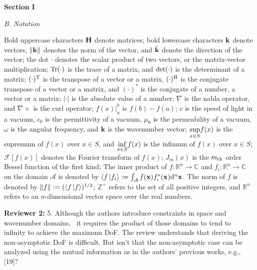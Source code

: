 \documentclass[a4paper,12pt]{article}
\begin{document}
{}
\begin{framed}
    {\bf Section I}

    {\it B. Notation}
    
    \quad Bold uppercase characters {\color{red}${\bf H}$} denote matrices;
    bold lowercase characters {\color{red}${\bf k}$} denote vectors, {\color{red} $\left\| {\bf k} \right\|$ denotes the norm of the vector, and $\hat{\bf k}$ denote the direction of the vector};
    the dot $\cdot$ denotes the scalar product of two vectors, or the matrix-vector multiplication; {\color{red} ${\rm Tr(\cdot)}$ is the trace of a matrix, and ${\rm det}(\cdot)$ is the determinant of a matrix; $(\cdot)^{\rm T}$ is the transpose of a vector or a matrix, $(\cdot)^{\rm H}$ is the conjugate transpose of a vector or a matrix, and $(\cdot)^{*}$ is the conjugate of a number, a vector or a matrix; $|\cdot|$ is the absolute value of a number; $\nabla$ is the nabla operator, and $\nabla \times$ is the curl operator; $f(x)|_a^b$ is $f(b)-f(a)$;}
    $c$ is the speed of light in a vacuum{\color{red}, $\epsilon_0$ is the permittivity of a vacuum, $\mu_0$ is the permeability of a vacuum, $\omega$ is the angular frequency, and ${\bf k}$ is the wavenumber vector; $\underset{x \in S}{\rm sup}f(x)$ is the supremum of $f(x)$ over $x\in S$, and $\underset{x \in S}{\rm inf}f(x)$ is the infimum of $f(x)$ over $x\in S$;} 
    $\mathscr{F}[f(x)]$ denotes the Fourier transform of $f(x)$; 
    $J_m(x)$ is the $m_{\rm th}$ order Bessel function of the first kind; 
    The inner product of $f: \mathbb{R}^n \rightarrow \mathbb{C}$ and $f_i: \mathbb{R}^n \rightarrow \mathbb{C}$ on the domain $\mathcal{A}$ is denoted by $\langle f \ket{f_i}:= \int_{\mathcal{A}} f({\bf x}) f_i^*({\bf x}) {\rm d}^n{\bf x}$. The norm of $f$ is denoted by $\left\| f \right\|:=(\langle f \ket{f})^{1/2} $; {\color{red}$\mathbb{Z}^+$ refers to the set of all positive integers, and $\mathbb{R}^{n}$ refers to an 
    	$n$-dimensional vector space over the real numbers}. 
\end{framed}


\textbf{Reviewer 2:}
5. Although the authors introduce constraints in space and wavenumber domains,  it requires the product of those domains to tend to infinity to achieve the maximum DoF. The review understands that deriving the non-asymptotic DoF is difficult. But isn’t that the non-asymptotic case can be analyzed using the mutual information as in the authors’ previous works, e.g., [19]?
\end{document}
